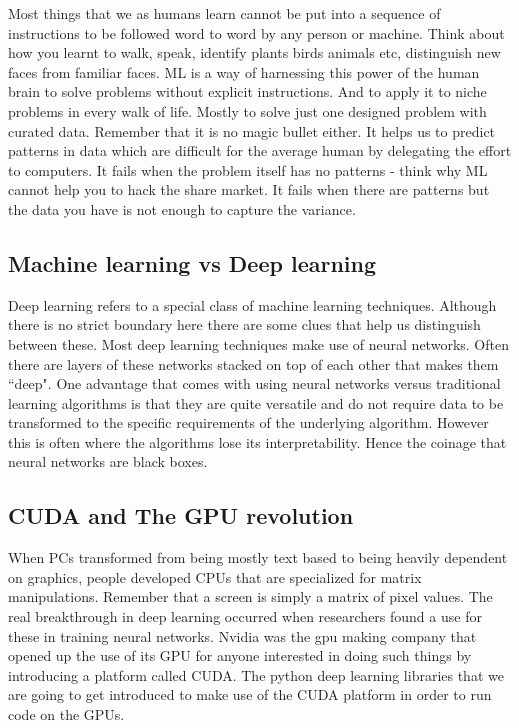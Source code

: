 \documentclass{../template/texnote}
\begin{document}
Most things that we as humans learn cannot be put into a sequence of instructions to be followed word to word by any person or machine. Think about how you learnt to walk, speak, identify plants birds animals etc, distinguish new faces from familiar faces. ML is a way of harnessing this power of the human brain to solve problems without explicit instructions. And to apply it to niche problems in every walk of life. Mostly to solve just one designed problem with curated data. Remember that it is no magic bullet either. It helps us to predict patterns in data which are difficult for the average human by delegating the effort to computers. It fails when the problem itself has no patterns - think why ML cannot help you to hack the share market. It fails when there are patterns but the data you have is not enough to capture the variance. 

\subsection{Machine learning vs Deep learning}

Deep learning refers to a special class of machine learning techniques. Although there is no strict boundary here there are some clues that help us distinguish between these. Most deep learning techniques make use of neural networks. Often there are layers of these networks stacked on top of each other that makes them “deep". One advantage that comes with using neural  networks versus traditional learning algorithms is that they are quite versatile and do not require data to be transformed to the specific requirements of the underlying algorithm. However this is often where the algorithms lose its interpretability. Hence the coinage that neural networks are black boxes.

\subsection{CUDA and The GPU revolution}

When PCs transformed from being mostly text based to being heavily dependent on graphics, people developed CPUs  that are specialized for matrix manipulations. Remember that a screen is simply a matrix of pixel values. The real breakthrough in deep learning occurred when researchers found a use for these in training neural networks. Nvidia was the gpu making company that opened up the use of its GPU for anyone interested in doing such things by introducing a platform called CUDA. The python deep learning libraries that we are going to get introduced to make use of the CUDA platform in order to run code on the GPUs.
\end{document}
